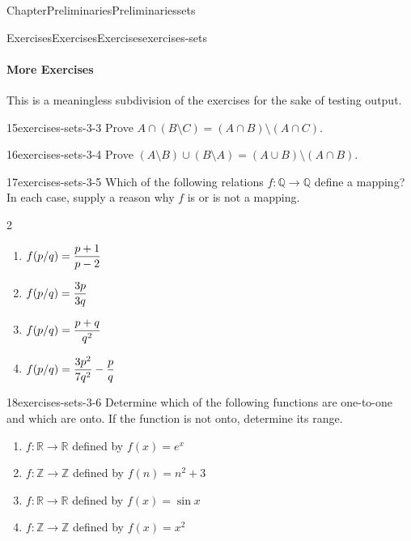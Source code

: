 \documentclass[oneside,10pt,]{book}
\numberwithin{equation}{section}
\begin{document}
\begin{chapterptx}{Chapter}{Preliminaries}{}{Preliminaries}{}{}{sets}
\begin{exercises-section}{Exercises}{Exercises}{}{Exercises}{}{}{exercises-sets}
\paragraph{More Exercises}\hypertarget{exercises-sets-3}{}
This is a meaningless subdivision of the exercises for the sake of testing output.%
\begin{divisionexercise}{15}{}{}{exercises-sets-3-3}%
Prove  \(A \cap (B \setminus C) = (A \cap B) \setminus (A \cap C)\).%
\end{divisionexercise}%
\begin{divisionexercise}{16}{}{}{exercises-sets-3-4}%
Prove  \((A \setminus B) \cup (B \setminus A) = (A \cup B) \setminus (A \cap B)\).%
\end{divisionexercise}%
\begin{divisionexercise}{17}{}{}{exercises-sets-3-5}%
Which of the following relations \(f: {\mathbb Q} \rightarrow {\mathbb Q}\) define a mapping? In each case, supply a reason why \(f\) is or is not a mapping.%
%
\begin{multicols}{2}
\begin{enumerate}[label={(\alph*)}]
\item{}\(\displaystyle \displaystyle f(p/q) = \frac{p+ 1}{p - 2}\)%
\item{}\(\displaystyle \displaystyle f(p/q) = \frac{3p}{3q}\)%
\item{}\(\displaystyle \displaystyle f(p/q) = \frac{p+q}{q^2}\)%
\item{}\(\displaystyle \displaystyle f(p/q) = \frac{3 p^2}{7 q^2} - \frac{p}{q}\)%
\end{enumerate}
\end{multicols}
\end{divisionexercise}%
\begin{divisionexercise}{18}{}{}{exercises-sets-3-6}%
Determine which of the following functions are one-to-one and which are onto.  If the function is not onto, determine its range.%
%
\begin{enumerate}[label={(\alph*)}]
\item{}\(f: {\mathbb R} \rightarrow {\mathbb R}\) defined by \(f(x) = e^x\)%
\item{}\(f: {\mathbb Z} \rightarrow {\mathbb Z}\) defined by \(f(n) = n^2 + 3\)%
\item{}\(f: {\mathbb R} \rightarrow {\mathbb R}\) defined by \(f(x) = \sin x\)%
\item{}\(f: {\mathbb Z} \rightarrow {\mathbb Z}\) defined by \(f(x) = x^2\)%
\end{enumerate}

\end{divisionexercise}
\end{exercises-section}
\end{chapterptx}
\end{document}
